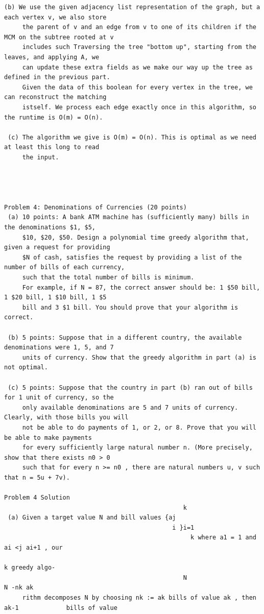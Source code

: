 \documentclass[12pt]{article}
\begin{document}
\begin{Verbatim}[breaklines=true,fontsize=\small]
 (b) We use the given adjacency list representation of the graph, but a each vertex v, we also store
     the parent of v and an edge from v to one of its children if the MCM on the subtree rooted at v
     includes such Traversing the tree "bottom up", starting from the leaves, and applying A, we
     can update these extra fields as we make our way up the tree as defined in the previous part.
     Given the data of this boolean for every vertex in the tree, we can reconstruct the matching
     istself. We process each edge exactly once in this algorithm, so the runtime is O(m) = O(n).

 (c) The algorithm we give is O(m) = O(n). This is optimal as we need at least this long to read
     the input.




Problem 4: Denominations of Currencies (20 points)
 (a) 10 points: A bank ATM machine has (sufficiently many) bills in the denominations $1, $5,
     $10, $20, $50. Design a polynomial time greedy algorithm that, given a request for providing
     $N of cash, satisfies the request by providing a list of the number of bills of each currency,
     such that the total number of bills is minimum.
     For example, if N = 87, the correct answer should be: 1 $50 bill, 1 $20 bill, 1 $10 bill, 1 $5
     bill and 3 $1 bill. You should prove that your algorithm is correct.

 (b) 5 points: Suppose that in a different country, the available denominations were 1, 5, and 7
     units of currency. Show that the greedy algorithm in part (a) is not optimal.

 (c) 5 points: Suppose that the country in part (b) ran out of bills for 1 unit of currency, so the
     only available denominations are 5 and 7 units of currency. Clearly, with those bills you will
     not be able to do payments of 1, or 2, or 8. Prove that you will be able to make payments
     for every sufficiently large natural number n. (More precisely, show that there exists n0 > 0
     such that for every n >= n0 , there are natural numbers u, v such that n = 5u + 7v).

Problem 4 Solution
                                                 k
 (a) Given a target value N and bill values {aj
                                              i }i=1
                                                   k where a1 = 1 and ai <j ai+1 , our
                                                                                     k greedy algo-
                                                 N                          N -nk ak
     rithm decomposes N by choosing nk := ak bills of value ak , then ak-1             bills of value


\end{Verbatim}
\end{document}
